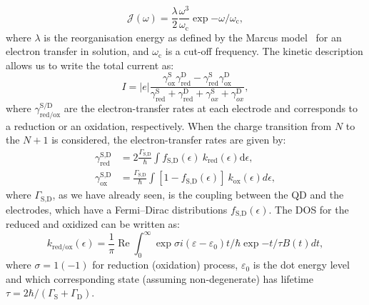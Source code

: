 \begin{equation}
    \mathcal{J}(\omega)=\frac{\lambda}{2}\frac{\omega^3}{\omega_\textrm{c}}\exp{-\omega/\omega_\textrm{c}},
    \label{eq:initial_vibration_equation}
\end{equation}
%
where $\lambda$ is the reorganisation energy as defined by the Marcus model~\cite{sowa2018beyond} for an electron transfer in solution, and $\omega_\textrm{c}$ is a cut-off frequency.
%
The kinetic description allows us to write the total current as:
\begin{equation}
    I=|e| \frac{\gamma_\text{ox}^\text{S} \gamma_{\text {red}}^\text{D}-\gamma_{\text {red}}^\text{S} \gamma_\text{ox}^\text{D}}{\gamma_{\text {red}}^\text{S}+\gamma_{\text {red}}^\text{D}+\gamma_{ox}^\text{S}+\gamma_{ox}^\text{D}},
\end{equation}
%
where $\gamma_{\text{red/ox}}^\text{S/D}$ are the electron-transfer rates at each electrode and corresponds to a reduction or an oxidation, respectively. When the charge transition from $N$ to the $N+1$ is considered, the electron-transfer rates are given by:
%
\begin{align}
    \gamma_{\text{red}}^\text{S,D} & = 2 \frac{\Gamma_\text{S,D}}{\hbar} \int f_\text{S,D}(\epsilon) ~k_\text{red}(\epsilon) \textrm{d}\epsilon,  \\
    \gamma_\text{ox}^\text{S,D}    & =\frac{\Gamma_\text{S,D}}{\hbar} \int\left[1-f_\text{S,D}(\epsilon)\right]~k_\text{ox}(\epsilon) d \epsilon,
\end{align}
%
where $\Gamma_\text{S,D}$, as we have already seen, is the coupling between the \gls{QD} and the electrodes, which have a Fermi--Dirac distributions $f_\text{S,D}(\epsilon)$. The \gls{DOS} for the reduced and oxidized can be written as:
%
\begin{equation}
    k_{\text{red/ox}}(\epsilon)=\frac{1}{\pi} \operatorname{Re} \int_{0}^{\infty} \exp{\sigma i(\varepsilon-\varepsilon_0) t / \hbar} \exp{-t / \tau} B(t) d t,
    \label{eq:redox_dos}
\end{equation}
%
where $\sigma=1(-1)$ for reduction (oxidation) process, $\varepsilon_0$ is the dot energy level and which corresponding state (assuming non-degenerate) has lifetime $\tau=2 \hbar /\left(\Gamma_\textrm{S}+\Gamma_\textrm{D}\right)$.

